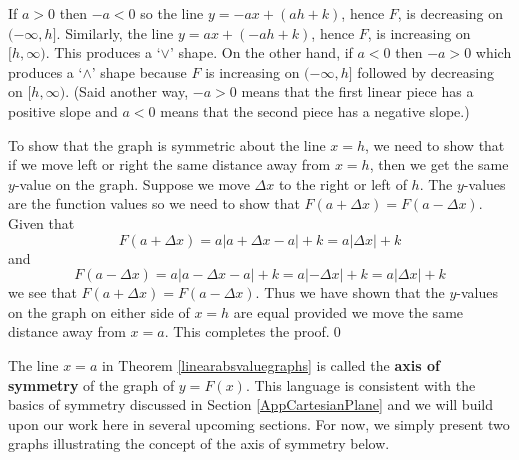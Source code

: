 \documentclass{ximera}
\begin{document}
\medskip

If $a > 0$ then $-a < 0$ so the line $y = -ax + (ah + k)$, hence $F$, is decreasing on $(-\infty, h]$.  Similarly,  the line $y = ax + (-ah + k)$, hence $F$, is increasing on $[h, \infty)$.  This produces a `$\vee$' shape.  On the other hand, if $a < 0$ then $-a > 0$ which produces a `$\wedge$' shape because $F$ is increasing on $(-\infty, h]$ followed by decreasing on $[h, \infty)$. (Said another way, $-a > 0$ means that the first linear piece has a positive slope and $a < 0$ means that the second piece has a negative slope.)

\medskip

To show that the graph is symmetric about the line $x = h$, we need to show that if we move left or right the same distance away from $x = h$, then we get the same $y$-value on the graph.  Suppose we move $\Delta x$ to the right or left of $h$.  The $y$-values are the function values so we need to show that $F(a + \Delta x) = F(a - \Delta x)$.   Given that \[F(a + \Delta x) = a| a + \Delta x - a| + k = a |\Delta x| + k\] and  \[F(a - \Delta x) = a | a - \Delta x - a| + k = a|-\Delta x| + k = a|\Delta x| + k\] we see that $F(a + \Delta x) = F(a - \Delta x)$. Thus we have shown that the $y$-values on the graph on either side of $x = h$ are equal provided we move the same distance away from $x = a$. This completes the proof.\qed

\medskip

The line $x = a$ in Theorem \ref{linearabsvaluegraphs} is called the  \textbf{axis of symmetry} of the graph of $y = F(x)$.  This language is consistent with the basics of symmetry discussed in Section \ref{AppCartesianPlane} and we will build upon our work here in several upcoming sections.  For now, we simply present two graphs illustrating the concept of the axis of symmetry below.
\end{document}
